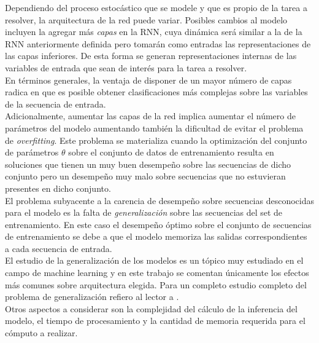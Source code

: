 \documentclass{article}
\begin{document}
	Dependiendo del proceso estocástico que se modele y que es propio de la tarea a resolver, la arquitectura de la red puede variar. Posibles cambios al modelo incluyen la agregar más \textit{capas} en la RNN, cuya dinámica será similar a la de la RNN anteriormente definida pero tomarán como entradas las representaciones de las capas inferiores. De esta forma se generan representaciones internas de las variables de entrada\cite{5IntermediateFeatures} que sean de interés para la tarea a resolver.\\
	En términos generales, la ventaja de disponer de un mayor número de capas radica en que es posible obtener clasificaciones más complejas sobre las variables de la secuencia de entrada.\\ Adicionalmente, aumentar las capas de la red implica aumentar el número de parámetros del modelo aumentando también la dificultad de evitar el problema de \textit{overfitting}. Este problema se materializa cuando la optimización del conjunto de parámetros $\theta$ sobre el conjunto de datos de entrenamiento resulta en soluciones que tienen un muy buen desempeño sobre las secuencias de dicho conjunto pero un desempeño muy malo sobre secuencias que no estuvieran presentes en dicho conjunto.\\
	El problema subyacente a la carencia de desempeño sobre secuencias desconocidas para el modelo es la falta de \textit{generalización} sobre las secuencias del set de entrenamiento. En este caso el desempeño óptimo sobre el conjunto de secuencias de entrenamiento se debe a que el modelo memoriza las salidas correspondientes a cada secuencia de entrada.\\
	El estudio de la generalización de los modelos es un tópico muy estudiado en el campo de machine learning y en este trabajo se comentan únicamente los efectos más comunes sobre arquitectura elegida. Para un completo estudio completo del problema de generalización refiero al lector a \cite{6Generalization}.\\
	
	Otros aspectos a considerar son la complejidad del cálculo de la inferencia del modelo, el tiempo de procesamiento y la cantidad de memoria requerida para el cómputo a realizar.\\
	
\end{document}
